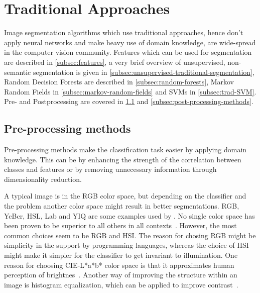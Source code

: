 
\newcommand\independent{\protect\mathpalette{\protect\independenT}{\perp}}
\def\independenT#1#2{\mathrel{\rlap{$#1#2$}\mkern2mu{#1#2}}}

\section{Traditional Approaches}\label{sec:traditional-approaches}%
Image segmentation algorithms which use traditional approaches, hence don't
apply neural networks and make heavy use of domain knowledge, are wide-spread
in the computer vision community. Features which can be used for segmentation
are described in \cref{subsec:features}, a very brief overview of unsupervised,
non-semantic segmentation is given in
\cref{subsec:unsupervised-traditional-segmentation}, Random Decision
Forests are described in \cref{subsec:random-forests}, Markov Random Fields in
\cref{subsec:markov-random-fields} and \glspl{SVM} in
\cref{subsec:trad-SVM}.
Pre- and Postprocessing are covered in \cref{subsec:preprocessing-methods} and
\cref{subsec:post-processing-methods}.








\subsection{Pre-processing methods}\label{subsec:preprocessing-methods}%
Pre-processing methods make the classification task easier by applying domain
knowledge. This can be by enhancing the strength of the correlation between
classes and features or by removing unnecessary information through
dimensionality reduction.

A typical image is in the RGB color space, but depending on the classifier and
the problem another color space might result in better segmentations. RGB,
YcBcr, HSL, Lab and YIQ are some examples used by \cite{cohen2015memory}. No
single color space has been proven to be superior to all others in all
contexts~\cite{cheng2001color}. However, the most common choices seem to be RGB
and HSI. The reason for chosing RGB might be simplicity in the support by
programming languages, whereas the choice of HSI might make it simpler for the
classifier to get invariant to illumination. One reason for choosing CIE-L*a*b*
color space is that it approximates human perception of
brightnes~\cite{kasson1992analysis}. Another way of improving the structure
within an image is histogram equalization, which can be applied to improve
contrast~\cite{pizer1987adaptive,4228537}.

